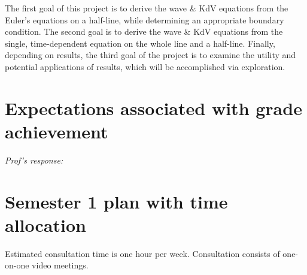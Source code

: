 \documentclass[10pt, oneside, a4paper]{article}
\begin{document}
The first goal of this project is to derive the wave \& KdV equations from the Euler's equations on a half-line, while determining an appropriate boundary condition. The second goal is to derive the wave \& KdV equations from the single, time-dependent equation on the whole line and a half-line. Finally, depending on results, the third goal of the project is to examine the utility and potential applications of results, which will be accomplished via exploration. 
\section{Expectations associated with grade achievement}

\emph{Prof's response:}
\section{Semester 1 plan with time allocation}

Estimated consultation time is one hour per week. Consultation consists of one-on-one video meetings.
\end{document}
